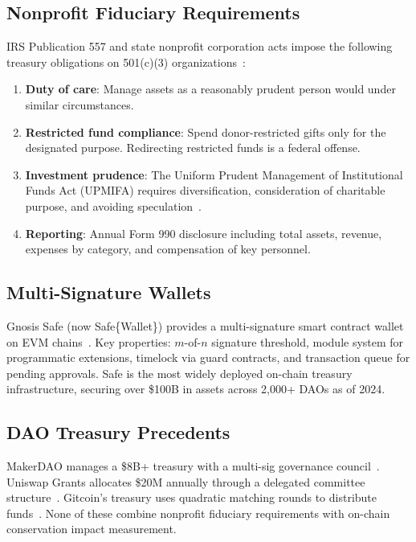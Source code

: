 \documentclass[11pt,letterpaper]{article}
\begin{document}
\subsection{Nonprofit Fiduciary Requirements}

IRS Publication 557 and state nonprofit corporation acts impose the following treasury obligations on 501(c)(3) organizations~\cite{irs557}:

\begin{enumerate}
    \item \textbf{Duty of care}: Manage assets as a reasonably prudent person would under similar circumstances.
    \item \textbf{Restricted fund compliance}: Spend donor-restricted gifts only for the designated purpose. Redirecting restricted funds is a federal offense.
    \item \textbf{Investment prudence}: The Uniform Prudent Management of Institutional Funds Act (UPMIFA) requires diversification, consideration of charitable purpose, and avoiding speculation~\cite{upmifa2006}.
    \item \textbf{Reporting}: Annual Form 990 disclosure including total assets, revenue, expenses by category, and compensation of key personnel.
\end{enumerate}

\subsection{Multi-Signature Wallets}

Gnosis Safe (now Safe\{Wallet\}) provides a multi-signature smart contract wallet on EVM chains~\cite{gnosis2021}. Key properties: $m$-of-$n$ signature threshold, module system for programmatic extensions, timelock via guard contracts, and transaction queue for pending approvals. Safe is the most widely deployed on-chain treasury infrastructure, securing over \$100B in assets across 2{,}000+ DAOs as of 2024.

\subsection{DAO Treasury Precedents}

MakerDAO manages a \$8B+ treasury with a multi-sig governance council~\cite{maker2023}. Uniswap Grants allocates \$20M annually through a delegated committee structure~\cite{uniswapgrants2023}. Gitcoin's treasury uses quadratic matching rounds to distribute funds~\cite{gitcoin2023}. None of these combine nonprofit fiduciary requirements with on-chain conservation impact measurement.
\end{document}
